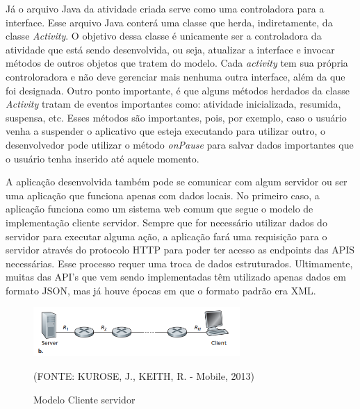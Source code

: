 \documentclass[
    12pt,       %
    openright,      %
    twoside,      %
    a4paper,      %
    english,      %
    french,       %
    spanish,      %
    brazil,       %
    ]{abntex2}
\begin{document}
        Já o arquivo Java da atividade criada serve como uma controladora para a interface. Esse
        arquivo Java conterá uma classe que herda, indiretamente, da classe \textit{Activity}. O
        objetivo dessa classe é unicamente ser a controladora da atividade que está sendo
        desenvolvida, ou seja, atualizar a interface e invocar métodos de outros objetos que tratem
        do modelo. Cada \textit{activity} tem sua própria controloradora e não deve gerenciar mais
        nenhuma outra interface, além da que foi designada. Outro ponto importante, é que alguns métodos
        herdados da classe \textit{Activity} tratam de eventos importantes como: atividade inicializada,
        resumida, suspensa, etc. Esses métodos são importantes, pois, por exemplo, caso o usuário
        venha a suspender o aplicativo que esteja executando para utilizar outro, o desenvolvedor
        pode utilizar o método \textit{onPause} para salvar dados importantes que o usuário tenha
        inserido até aquele momento.

        A aplicação desenvolvida também pode se comunicar com algum servidor ou ser uma aplicação
        que funciona apenas com dados locais. No primeiro caso, a aplicação funciona como um sistema
        web comum que segue o modelo de implementação cliente servidor. Sempre que for necessário
        utilizar dados do servidor para executar alguma ação, a aplicação fará uma requisição para
        o servidor através do protocolo HTTP para poder ter acesso as endpoints das APIS
        necessárias. Esse processo requer uma troca de dados estruturados. Ultimamente, muitas das
        API's que vem sendo implementadas têm utilizado apenas dados em formato JSON, mas já houve
        épocas em que o formato padrão era XML.

        \begin{figure}[htbp]
            \begin{center}
                \includegraphics[width=0.7\textwidth]{img/clientServer.png}
            \end{center}
        \caption{\label{fig:passaro} Modelo Cliente servidor}
        \begin{center}(FONTE: KUROSE, J., KEITH, R. - Mobile, 2013)\end{center}
        \end{figure}
\end{document}
